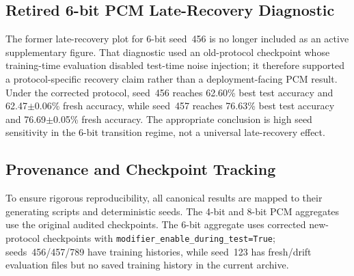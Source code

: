 \subsection{Retired 6-bit PCM Late-Recovery Diagnostic}
\label{subsec:supp-late-recovery}

The former late-recovery plot for 6-bit seed~456 is no longer included as an active supplementary figure. That diagnostic used an old-protocol checkpoint whose training-time evaluation disabled test-time noise injection; it therefore supported a protocol-specific recovery claim rather than a deployment-facing PCM result. Under the corrected protocol, seed~456 reaches 62.60\% best test accuracy and 62.47\(\pm\)0.06\% fresh accuracy, while seed~457 reaches 76.63\% best test accuracy and 76.69\(\pm\)0.05\% fresh accuracy. The appropriate conclusion is high seed sensitivity in the 6-bit transition regime, not a universal late-recovery effect.

\subsection{Provenance and Checkpoint Tracking}
\label{subsec:supp-provenance}

To ensure rigorous reproducibility, all canonical results are mapped to their generating scripts and deterministic seeds. The 4-bit and 8-bit PCM aggregates use the original audited checkpoints. The 6-bit aggregate uses corrected new-protocol checkpoints with \texttt{modifier\_enable\_during\_test=True}; seeds~456/457/789 have training histories, while seed~123 has fresh/drift evaluation files but no saved training history in the current archive.

